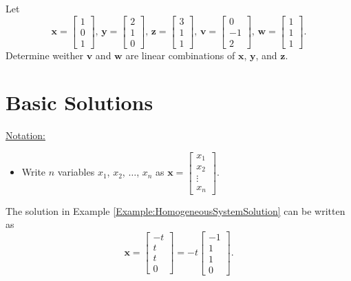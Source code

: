 \documentclass[20pt,a4paper]{extarticle}
\newcounter{example}[section]
\begin{document}
\begin{example}
Let 
	\[
		\mathbf{x} = \begin{bmatrix} 1 \\ 0 \\ 1 \end{bmatrix}, \, 
		\mathbf{y} = \begin{bmatrix} 2 \\ 1 \\ 0 \end{bmatrix} , \,
		\mathbf{z} = \begin{bmatrix} 3 \\ 1 \\ 1 \end{bmatrix}, \,
		\mathbf{v} = \begin{bmatrix} 0 \\ -1 \\ 2 \end{bmatrix} , \,
		\mathbf{w} = \begin{bmatrix} 1 \\ 1 \\ 1 \end{bmatrix} .
	\]
Determine weither $\mathbf{v}$ and $\mathbf{w}$ are linear combinations of $\mathbf{x}$, $\mathbf{y}$, and $\mathbf{z}$.
\end{example}

\begin{solution}

\end{solution}

\newpage 

\phantom{2} 

\newpage 

\section{Basic Solutions}

\underline{Notation:}
	\begin{itemize}
		\item Write $n$ variables $x_1$, $x_2$, $\ldots$, $x_n$ as $\mathbf{x} = \begin{bmatrix} x_1 \\ x_2 \\ \vdots \\ x_n \end{bmatrix}$.
	\end{itemize}

The solution in Example \ref{Example:HomogeneousSystemSolution} can be written as
	\[
		\mathbf{x} = \begin{bmatrix} -t \\ t \\ t \\ 0 \end{bmatrix} = -t \begin{bmatrix} -1 \\ 1 \\ 1 \\ 0 \end{bmatrix} .
	\]
\end{document}
